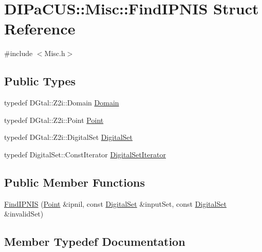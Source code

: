 \hypertarget{structDIPaCUS_1_1Misc_1_1FindIPNIS}{}\section{D\+I\+Pa\+C\+US\+:\+:Misc\+:\+:Find\+I\+P\+N\+IS Struct Reference}
\label{structDIPaCUS_1_1Misc_1_1FindIPNIS}


{\ttfamily \#include $<$Misc.\+h$>$}

\subsection*{Public Types}
\begin{DoxyCompactItemize}
\item 
typedef D\+Gtal\+::\+Z2i\+::\+Domain \hyperlink{structDIPaCUS_1_1Misc_1_1FindIPNIS_af7997086b94b72bc970cdb982ad0535a}{Domain}
\item 
typedef D\+Gtal\+::\+Z2i\+::\+Point \hyperlink{structDIPaCUS_1_1Misc_1_1FindIPNIS_af4506f1e1704bc3ee542ee3000694ee1}{Point}
\item 
typedef D\+Gtal\+::\+Z2i\+::\+Digital\+Set \hyperlink{structDIPaCUS_1_1Misc_1_1FindIPNIS_aa92a8a962ef5fb194297977646f84dc4}{Digital\+Set}
\item 
typedef Digital\+Set\+::\+Const\+Iterator \hyperlink{structDIPaCUS_1_1Misc_1_1FindIPNIS_a40979223d434fc5f75ca899cc7add8fd}{Digital\+Set\+Iterator}
\end{DoxyCompactItemize}
\subsection*{Public Member Functions}
\begin{DoxyCompactItemize}
\item 
\hyperlink{structDIPaCUS_1_1Misc_1_1FindIPNIS_a2a14b039bc1efdc8adfa4285d8b65972}{Find\+I\+P\+N\+IS} (\hyperlink{structDIPaCUS_1_1Misc_1_1FindIPNIS_af4506f1e1704bc3ee542ee3000694ee1}{Point} \&ipnil, const \hyperlink{structDIPaCUS_1_1Misc_1_1FindIPNIS_aa92a8a962ef5fb194297977646f84dc4}{Digital\+Set} \&input\+Set, const \hyperlink{structDIPaCUS_1_1Misc_1_1FindIPNIS_aa92a8a962ef5fb194297977646f84dc4}{Digital\+Set} \&invalid\+Set)
\end{DoxyCompactItemize}


\subsection{Member Typedef Documentation}
\mbox{\label{structDIPaCUS_1_1Misc_1_1FindIPNIS_aa92a8a962ef5fb194297977646f84dc4}} 

